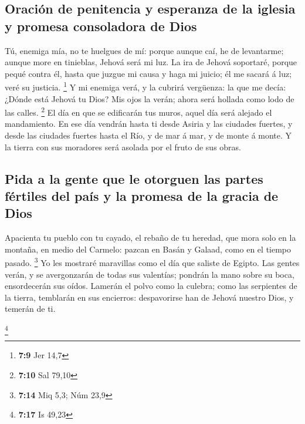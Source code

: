 \hypertarget{oraciuxf3n-de-penitencia-y-esperanza-de-la-iglesia-y-promesa-consoladora-de-dios}{%
\subsection{Oración de penitencia y esperanza de la iglesia y promesa
consoladora de
Dios}\label{oraciuxf3n-de-penitencia-y-esperanza-de-la-iglesia-y-promesa-consoladora-de-dios}}

 Tú, enemiga mía, no te huelgues de mí: porque aunque caí,
he de levantarme; aunque more en tinieblas, Jehová será mi luz.
 La ira de Jehová soportaré, porque pequé contra él, hasta
que juzgue mi causa y haga mi juicio; él me sacará á luz; veré su
justicia. \footnote{\textbf{7:9} Jer 14,7}  Y mi enemiga
verá, y la cubrirá vergüenza: la que me decía: ¿Dónde está Jehová tu
Dios? Mis ojos la verán; ahora será hollada como lodo de las calles.
\footnote{\textbf{7:10} Sal 79,10}  El día en que se
edificarán tus muros, aquel día será alejado el mandamiento.
 En ese día vendrán hasta ti desde Asiria y las ciudades
fuertes, y desde las ciudades fuertes hasta el Río, y de mar á mar, y de
monte á monte.  Y la tierra con sus moradores será asolada
por el fruto de sus obras.

\hypertarget{pida-a-la-gente-que-le-otorguen-las-partes-fuxe9rtiles-del-pauxeds-y-la-promesa-de-la-gracia-de-dios}{%
\subsection{Pida a la gente que le otorguen las partes fértiles del país
y la promesa de la gracia de
Dios}\label{pida-a-la-gente-que-le-otorguen-las-partes-fuxe9rtiles-del-pauxeds-y-la-promesa-de-la-gracia-de-dios}}

 Apacienta tu pueblo con tu cayado, el rebaño de tu
heredad, que mora solo en la montaña, en medio del Carmelo: pazcan en
Basán y Galaad, como en el tiempo pasado. \footnote{\textbf{7:14} Miq
  5,3; Núm 23,9}  Yo les mostraré maravillas como el día
que saliste de Egipto.  Las gentes verán, y se avergonzarán
de todas sus valentías; pondrán la mano sobre su boca, ensordecerán sus
oídos.  Lamerán el polvo como la culebra; como las
serpientes de la tierra, temblarán en sus encierros: despavorirse han de
Jehová nuestro Dios, y temerán de ti.

\footnote{\textbf{7:17} Is 49,23}

